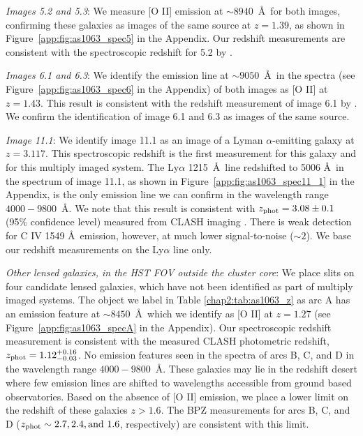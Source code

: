 \textit{Images 5.2 and 5.3}: We measure [O II] emission at $\sim8940$~\AA\ for both images, confirming these galaxies as images of the same source at $z=1.39$, as shown in Figure~\ref{app:fig:as1063_spec5} in the Appendix. Our redshift measurements are consistent with the spectroscopic redshift for 5.2 by  \citet{Richard:2014gf}.

\textit{Images 6.1 and 6.3}: We identify the emission line at $\sim9050$~\AA\ in the spectra (see Figure~\ref{app:fig:as1063_spec6} in the Appendix) of both images as [O II] at $z=1.43$. This result is consistent with the redshift measurement of image 6.1 by  \citet{Richard:2014gf}. We confirm the identification of image 6.1 and 6.3 as images of the same source.

\textit{Image 11.1}: We identify image 11.1 as an image of a Lyman $\alpha$-emitting galaxy at $z=3.117$. This spectroscopic redshift is the first measurement for this galaxy and for this multiply imaged system. The Ly$\alpha$ 1215~\AA\ line redshifted to 5006 \AA\ in the spectrum of image 11.1, as shown in Figure~\ref{app:fig:as1063_spec11_1} in the Appendix, is the only emission line we can confirm in the wavelength range $4000-9800$~\AA. We note that this result is consistent with $z_\mathrm{phot}=3.08\pm0.1$ (95\% confidence level) measured from CLASH imaging \citep{Jouvel:2014qy}. There is weak detection for C IV 1549 \AA\ emission, however, at much lower signal-to-noise ($\sim2$). We base our redshift measurements on the Ly$\alpha$ line only.

\textit{Other lensed galaxies, in the HST FOV outside the cluster core}: We place slits on four candidate lensed galaxies, which have not been identified as part of multiply imaged systems. The object we label in Table \ref{chap2:tab:as1063_z} as arc A has an emission feature at $\sim8450$~\AA\ which we identify as [O II] at $z=1.27$ (see Figure~\ref{app:fig:as1063_specA} in the Appendix). Our spectroscopic redshift measurement is consistent with the measured CLASH photometric redshift, $z_\mathrm{phot}=1.12^{+0.16}_{-0.03}$. No emission features seen in the spectra of arcs B, C, and D in the wavelength range $4000-9800$~\AA. These galaxies may lie in the redshift desert where few emission lines are shifted to wavelengths accessible from ground based observatories. Based on the absence of [O II] emission, we place a lower limit on the redshift of these galaxies $z>1.6$. The BPZ measurements for arcs B, C, and D ($z_\mathrm{phot}\sim2.7,2.4,\mathrm{and}\ 1.6$, respectively) are consistent with this limit.

